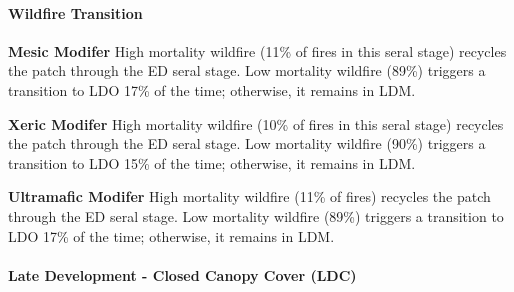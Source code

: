 \paragraph{Wildfire Transition}
\begin{adjustwidth}{2cm}{}
\textbf{Mesic Modifer } High mortality wildfire (11\% of fires in this seral stage) recycles the patch through the ED seral stage. Low mortality wildfire (89\%) triggers a transition to LDO 17\% of the time; otherwise, it remains in LDM.

\medskip
\noindent \textbf{Xeric Modifer} High mortality wildfire (10\% of fires in this seral stage) recycles the patch through the ED seral stage. Low mortality wildfire (90\%) triggers a transition to LDO 15\% of the time; otherwise, it remains in LDM.

\medskip
\noindent \textbf{Ultramafic Modifer}  High mortality wildfire (11\% of fires) recycles the patch through the ED seral stage. Low mortality wildfire (89\%) triggers a transition to LDO 17\% of the time; otherwise, it remains in LDM.

\end{adjustwidth}
\noindent\hrulefill

\paragraph{Late Development - Closed Canopy Cover (LDC)}

